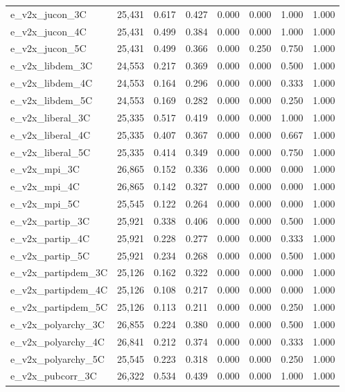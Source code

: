 \begin{table}[!htbp]
\begin{tabular}{@{\extracolsep{5pt}}lccccccc}
e\_v2x\_jucon\_3C & 25,431 & 0.617 & 0.427 & 0.000 & 0.000 & 1.000 & 1.000 \\ 
e\_v2x\_jucon\_4C & 25,431 & 0.499 & 0.384 & 0.000 & 0.000 & 1.000 & 1.000 \\ 
e\_v2x\_jucon\_5C & 25,431 & 0.499 & 0.366 & 0.000 & 0.250 & 0.750 & 1.000 \\ 
e\_v2x\_libdem\_3C & 24,553 & 0.217 & 0.369 & 0.000 & 0.000 & 0.500 & 1.000 \\ 
e\_v2x\_libdem\_4C & 24,553 & 0.164 & 0.296 & 0.000 & 0.000 & 0.333 & 1.000 \\ 
e\_v2x\_libdem\_5C & 24,553 & 0.169 & 0.282 & 0.000 & 0.000 & 0.250 & 1.000 \\ 
e\_v2x\_liberal\_3C & 25,335 & 0.517 & 0.419 & 0.000 & 0.000 & 1.000 & 1.000 \\ 
e\_v2x\_liberal\_4C & 25,335 & 0.407 & 0.367 & 0.000 & 0.000 & 0.667 & 1.000 \\ 
e\_v2x\_liberal\_5C & 25,335 & 0.414 & 0.349 & 0.000 & 0.000 & 0.750 & 1.000 \\ 
e\_v2x\_mpi\_3C & 26,865 & 0.152 & 0.336 & 0.000 & 0.000 & 0.000 & 1.000 \\ 
e\_v2x\_mpi\_4C & 26,865 & 0.142 & 0.327 & 0.000 & 0.000 & 0.000 & 1.000 \\ 
e\_v2x\_mpi\_5C & 25,545 & 0.122 & 0.264 & 0.000 & 0.000 & 0.000 & 1.000 \\ 
e\_v2x\_partip\_3C & 25,921 & 0.338 & 0.406 & 0.000 & 0.000 & 0.500 & 1.000 \\ 
e\_v2x\_partip\_4C & 25,921 & 0.228 & 0.277 & 0.000 & 0.000 & 0.333 & 1.000 \\ 
e\_v2x\_partip\_5C & 25,921 & 0.234 & 0.268 & 0.000 & 0.000 & 0.500 & 1.000 \\ 
e\_v2x\_partipdem\_3C & 25,126 & 0.162 & 0.322 & 0.000 & 0.000 & 0.000 & 1.000 \\ 
e\_v2x\_partipdem\_4C & 25,126 & 0.108 & 0.217 & 0.000 & 0.000 & 0.000 & 1.000 \\ 
e\_v2x\_partipdem\_5C & 25,126 & 0.113 & 0.211 & 0.000 & 0.000 & 0.250 & 1.000 \\ 
e\_v2x\_polyarchy\_3C & 26,855 & 0.224 & 0.380 & 0.000 & 0.000 & 0.500 & 1.000 \\ 
e\_v2x\_polyarchy\_4C & 26,841 & 0.212 & 0.374 & 0.000 & 0.000 & 0.333 & 1.000 \\ 
e\_v2x\_polyarchy\_5C & 25,545 & 0.223 & 0.318 & 0.000 & 0.000 & 0.250 & 1.000 \\ 
e\_v2x\_pubcorr\_3C & 26,322 & 0.534 & 0.439 & 0.000 & 0.000 & 1.000 & 1.000 \\ 

\end{tabular}
\end{table}
